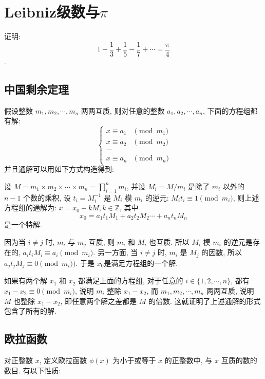 \newpage
\section{Leibniz级数与$\pi$}

证明: $$ 1 - \frac{1}{3} + \frac{1}{5} - \frac{1}{7} + \cdots = \frac{\pi}{4} $$.

\subsection{中国剩余定理}
假设整数 $ m_1, m_2, \cdots, m_n $ 两两互质, 则对任意的整数 $ a_1, a_2, \cdots, a_n $, 下面的方程组都有解: 
\begin{equation*}
\ \begin{cases}
x\equiv a_{1} & \pmod{m_1}\\
x\equiv a_{2} & \pmod{m_2}\\
\cdots  & \\
x\equiv a_{n} & \pmod{m_n}
\end{cases}
\end{equation*}
并且通解可以用如下方式构造得到: 

设 $ M = m_1\times m_2\times\cdots\times m_n = \prod_{i=1}^{n}{m_i} $, 并设 $ M_i = M / m_i $ 是除了 $ m_i $ 以外的 $ n - 1 $ 个数的乘积, 设 $ t_i = M_i^{-1} $ 是 $ M_i $ 模 $ m_i $ 的逆元: $ M_it_i \equiv 1 \pmod{m_i} $, 则上述方程组的通解为: $ x = x_0 + kM, k\in \mathbb{Z} $, 其中 $$ x_0 = a_1t_1M_1 + a_2t_2M_2\cdots + a_nt_nM_n $$ 是一个特解.

因为当 $ i \neq j $ 时, $ m_i $ 与 $ m_j $ 互质, 则 $ m_i $ 和 $ M_i $ 也互质. 所以 $ M_i $ 模 $ m_i $ 的逆元是存在的, $ a_it_iM_i \equiv a_i \pmod{m_i} $. 另一方面, 当 $ i \neq j $ 时, $ m_i $ 是 $ M_j $ 的因数, 所以 $ a_jt_jM_j \equiv 0 \pmod{m_i}) $. 于是 $ x_0 $是满足方程组的一个解. 

如果有两个解 $ x_1 $ 和 $ x_2 $ 都满足上面的方程组, 对于任意的 $ i\in\{1, 2, \cdots, n\} $, 都有 $ x_1 - x_2 \equiv 0 \pmod{m_i} $, 说明 $ m_i $ 整除 $ x_1 - x_2 $, 而 $ m_1, m_2, \cdots, m_n $ 两两互质, 说明 $ M $ 也整除 $ x_1 - x_2 $, 即任意两个解之差都是 $ M $ 的倍数. 这就证明了上述通解的形式包含了所有的解.

\subsection{欧拉函数}
对正整数 $ x $, 定义欧拉函数 $ \phi(x) $ 为小于或等于 $ x $ 的正整数中, 与 $ x $ 互质的数的数目. 
有以下性质:

